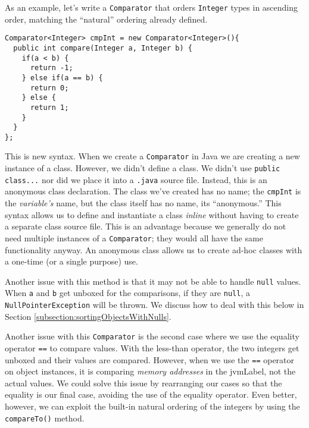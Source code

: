 As an example, let's write a \texttt{Comparator} that orders 
\texttt{Integer} types in ascending order, matching the
``natural'' ordering already defined.

\begin{verbatim}
Comparator<Integer> cmpInt = new Comparator<Integer>(){
  public int compare(Integer a, Integer b) {
    if(a < b) {
      return -1;
    } else if(a == b) {
      return 0;
    } else {
      return 1;
    }
  }
};
\end{verbatim}

This is new syntax.  When we create a \texttt{Comparator} in 
Java we are creating a new instance of a class.  However, we didn't define
a class.  We didn't use \texttt{public class...} nor did we place
it into a \texttt{.java} source file.  Instead, this is an
\gls{anonymous class} declaration.  The class we've created has no name; 
the \texttt{cmpInt} is the \emph{variable's} name, but the
class itself has no name, its ``anonymous.''  This syntax allows us to
define and instantiate a class \emph{inline} without having to create a
separate class source file.  This is an advantage because we generally
do not need multiple instances of a \texttt{Comparator}; they
would all have the same functionality anyway.  An anonymous class allows
us to create ad-hoc classes with a one-time (or a single purpose) use.

Another issue with this method is that it may not be able to handle 
\texttt{null} values.  When \texttt{a} and \texttt{b}
get unboxed for the comparisons, if they are \texttt{null}, 
a \texttt{NullPointerException} will be thrown.  We discuss
how to deal with this below in Section \ref{subsection:sortingObjectsWithNulls}.

Another issue with this \texttt{Comparator} is the second
case where we use the equality operator \texttt{==} to compare
values.  With the less-than operator, the two integers get unboxed and
their values are compared.  However, when we use the \texttt{==}
operator on object instances, it is comparing \emph{memory addresses} in
the \gls{jvmLabel}, not the actual values.  We could solve this issue by
rearranging our cases so that the equality is our final case, avoiding the
use of the equality operator.  Even better, however, we can exploit the
built-in natural ordering of the integers by using the \texttt{compareTo()}
method.

